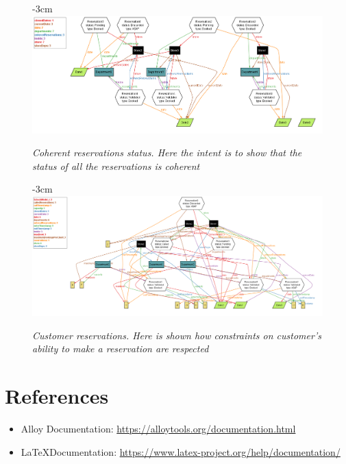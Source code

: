 \documentclass{article}
\begin{document}
	
	\begin{figure}[H]
		\begin{adjustwidth} {-3cm}{}
			\centering
			\includegraphics[scale=0.5]{AlloyModel/reservationStatus.png}\\	
		\end{adjustwidth}
		\caption{\emph{Coherent reservations status. Here the intent is to show that the status of all the reservations is coherent}}
	\end{figure}
	
	\begin{figure}[H]
		\begin{adjustwidth} {-3cm}{}
			\centering
			\includegraphics[scale=0.4, angle = 90]{AlloyModel/customerReservation.png}\\
		\end{adjustwidth}
		\caption{\emph{Customer reservations. Here is shown how constraints on customer's ability to make a reservation are respected}}
	\end{figure}

\section{References}
	\begin{itemize}
		\item Alloy Documentation: \url{https://alloytools.org/documentation.html}
		\item \LaTeX Documentation: \url{https://www.latex-project.org/help/documentation/}
	\end{itemize}	
	\bigskip
	
\end{document}
